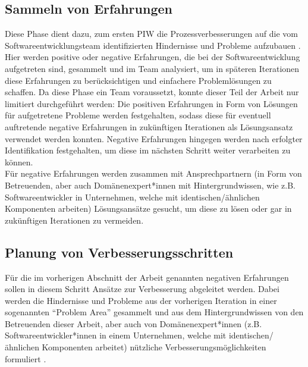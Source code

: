 \subsection{Sammeln von Erfahrungen}
Diese Phase dient dazu, zum ersten PIW die Prozessverbesserungen auf die vom Softwareentwicklungsteam identifizierten Hindernisse und Probleme aufzubauen \cite{salo2007iterative}. Hier werden positive oder negative Erfahrungen, die bei der Softwareentwicklung aufgetreten sind, gesammelt und im Team analysiert, um in späteren Iterationen diese Erfahrungen zu berücksichtigen und einfachere Problemlösungen zu schaffen. Da diese Phase ein Team voraussetzt, konnte dieser Teil der Arbeit nur limitiert durchgeführt werden: Die positiven Erfahrungen in Form von Lösungen für aufgetretene Probleme werden festgehalten, sodass diese für eventuell auftretende negative Erfahrungen in zukünftigen Iterationen als Lösungsansatz verwendet werden konnten. Negative Erfahrungen hingegen werden nach erfolgter Identifikation festgehalten, um diese im nächsten Schritt weiter verarbeiten zu können. \\
Für negative Erfahrungen werden zusammen mit Ansprechpartnern (in Form von Betreuenden, aber auch Domänenexpert*innen mit Hintergrundwissen, wie z.B. Softwareentwickler in Unternehmen, welche mit identischen/ähnlichen Komponenten arbeiten) Lösungsansätze gesucht, um diese zu lösen oder gar in zukünftigen Iterationen zu vermeiden.

\subsection{Planung von Verbesserungsschritten}
Für die im vorherigen Abschnitt der Arbeit genannten negativen Erfahrungen sollen in diesem Schritt Ansätze zur Verbesserung abgeleitet werden. Dabei werden die Hindernisse und Probleme aus der vorherigen Iteration in einer sogenannten \enquote{Problem Area} gesammelt und aus dem Hintergrundwissen von den Betreuenden dieser Arbeit, aber auch von Domänenexpert*innen (z.B. Softwareentwickler*innen in einem Unternehmen, welche mit identischen/ähnlichen Komponenten arbeitet) nützliche Verbesserungsmöglichkeiten formuliert \cite{salo2007iterative}. 

